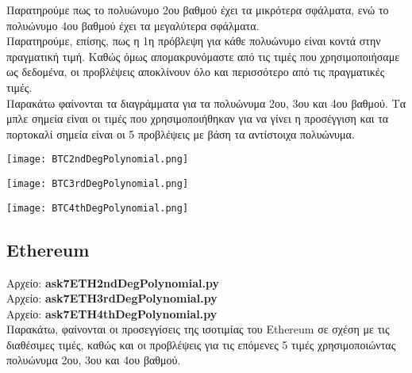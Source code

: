 \documentclass{article}
\newcommand{\lt}{\latintext}
\newcommand{\gt}{\greektext}
\begin{document}
\gt
Παρατηρούμε πως το πολυώνυμο 2ου βαθμού έχει τα μικρότερα σφάλματα, ενώ το πολυώνυμο 4ου βαθμού έχει τα μεγαλύτερα σφάλματα.\\
Παρατηρούμε, επίσης, πως η 1η πρόβλεψη για κάθε πολυώνυμο είναι κοντά στην πραγματική τιμή. Καθώς όμως απομακρυνόμαστε από τις τιμές που χρησιμοποιήσαμε ως δεδομένα, οι προβλέψεις αποκλίνουν όλο και περισσότερο από τις πραγματικές τιμές.\\
Παρακάτω φαίνονται τα διαγράμματα για τα πολυώνυμα 2ου, 3ου και 4ου βαθμού. Τα μπλε σημεία είναι οι τιμές που χρησιμοποιήθηκαν για να γίνει η προσέγγιση και τα πορτοκαλί σημεία είναι οι 5 προβλέψεις με βάση τα αντίστοιχα πολυώνυμα.
\begin{center}
\texttt{[image: BTC2ndDegPolynomial.png]}
\end{center}

\begin{center}
\texttt{[image: BTC3rdDegPolynomial.png]}
\end{center}

\begin{center}
\texttt{[image: BTC4thDegPolynomial.png]}
\end{center}

\lt
\subsection{Ethereum}
\gt
Αρχείο: \lt \textbf{ask7ETH2ndDegPolynomial.py} \gt \\
Αρχείο: \lt \textbf{ask7ETH3rdDegPolynomial.py} \gt \\
Αρχείο: \lt \textbf{ask7ETH4thDegPolynomial.py} \gt \\
Παρακάτω, φαίνονται οι προσεγγίσεις της ισοτιμίας του \lt Ethereum \gt σε σχέση με τις διαθέσιμες τιμές, καθώς και οι προβλέψεις για τις επόμενες 5 τιμές χρησιμοποιώντας πολυώνυμα 2ου, 3ου και 4ου βαθμού.
\end{document}
